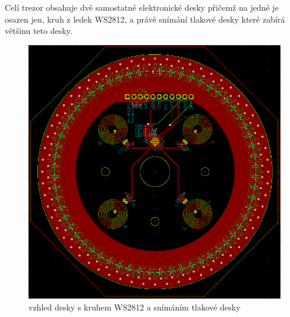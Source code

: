 \newpage

Celí trezor obsahuje dvě samostatné elektronické desky přičemž na jedné je osazen jen, kruh z ledek WS2812, a právě snímání tlakové desky které zabírá 
většinu teto desky.

\begin{figure}[htbp]
    \centering
    \includegraphics[width=\textwidth]{kapitoly/obrazky/E4/elektronika_tlakove_desky/leddeska-KiCad.png}
    \caption{vzhled desky s kruhem WS2812 a snímáním tlakové desky}
    \label{fig:E4-LedDeska}
\end{figure}

\newpage